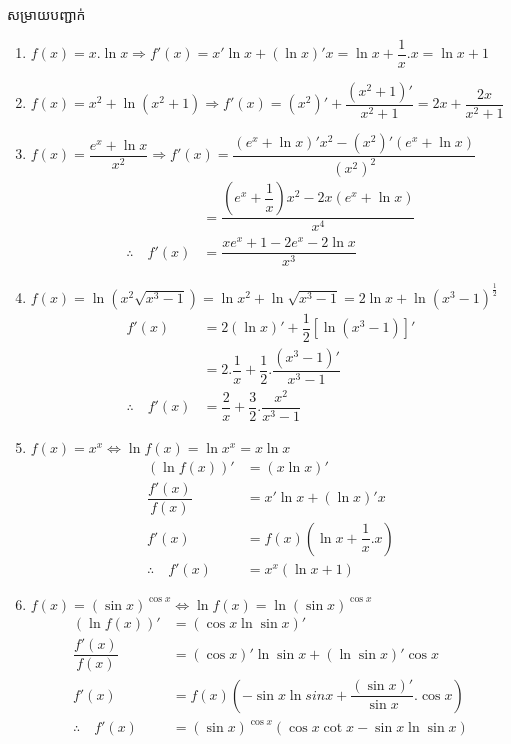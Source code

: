 \documentclass[12pt,fleqn]{book} %
\newcommand{\solution}{{\begin{center}\kml \color{blue} សម្រាយបញ្ជាក់\end{center} }}
\begin{document}
\solution 
\begin{enumerate}
\item $f(x)=x.\ln x\Longrightarrow f'(x)=x'\ln x+(\ln x)' x=\ln x+\dfrac{1}{x}.x=\ln x+1$
\item $f(x)=x^2+\ln (x^2+1)\Longrightarrow f'(x)=(x^2)'+\dfrac{(x^2+1)'}{x^2+1}=2x+\dfrac{2x}{x^2+1}$
\item $f(x)=\dfrac{e^x+\ln x}{x^2}\Longrightarrow f'(x)=\dfrac{(e^x+\ln x)'x^2-(x^2)'(e^x+\ln x)}{(x^2)^2}$
\begin{align*}
&=\dfrac{\left(e^x+\dfrac{1}{x}\right)x^2-2x(e^x+\ln x)}{x^4}\\
\therefore \quad f'(x)&=\dfrac{xe^x+1-2e^x-2\ln x}{x^3}
\end{align*}
\item $f(x)=\ln (x^2 \sqrt{x^3-1})=\ln x^2 +\ln \sqrt{x^3-1}=2\ln x+ \ln (x^3-1)^{\frac{1}{2}}$
\begin{align*}
f'(x)&=2(\ln x)'+\dfrac{1}{2}[\ln (x^3-1)]'\\
&=2.\dfrac{1}{x}+\dfrac{1}{2}.\dfrac{(x^3-1)'}{x^3-1}\\
\therefore \quad f'(x)&=\dfrac{2}{x}+\dfrac{3}{2}.\dfrac{x^2}{x^3-1}
\end{align*}
\item $f(x)=x^x \Longleftrightarrow \ln f(x)=\ln x^x=x\ln x $
\begin{align*}
\left(\ln f(x)\right)'&=(x\ln x)'\\
\dfrac{f'(x)}{f(x)}&=x'\ln x+(\ln x)'x\\
f'(x)&=f(x)(\ln x+\dfrac{1}{x}.x)\\
\therefore \quad f'(x)&=x^x(\ln x+1)
\end{align*}
\item $f(x)=(\sin x)^{\cos x}\Longleftrightarrow \ln f(x)=\ln (\sin x)^{\cos x}$
\begin{align*}
\left(\ln f(x) \right)'&= (\cos x\ln \sin x)'\\
\dfrac{f'(x)}{f(x)}&=(\cos x)'\ln \sin x+(\ln \sin x)'\cos x\\
f'(x)&=f(x)\left(-\sin x\ln sin x+\dfrac{(\sin x)'}{\sin x}.\cos x \right)\\
\therefore \quad f'(x)&=(\sin x)^{\cos x} \left( \cos x\cot x-\sin x\ln \sin x\right)
\end{align*}
\end{enumerate}
\end{document}
